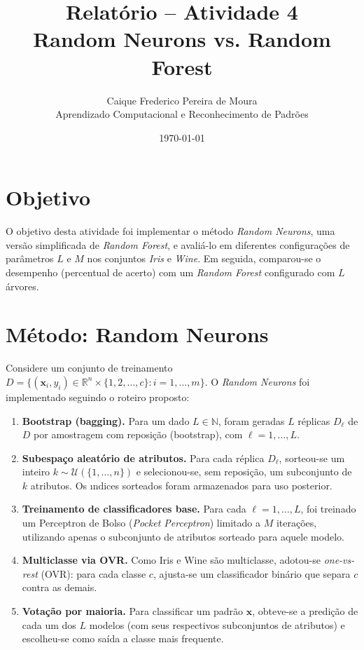 \documentclass[12pt,a4paper]{article}
\title{Relat\'orio -- Atividade 4\\Random Neurons vs. Random Forest}
\author{Caique Frederico Pereira de Moura\\ Aprendizado Computacional e Reconhecimento de Padr\~oes}
\date{\today}
\begin{document}
\maketitle

\section{Objetivo}
O objetivo desta atividade foi implementar o m\'etodo \emph{Random Neurons}, uma vers\~ao simplificada de \emph{Random Forest}, e avali\'a-lo em diferentes configura\c{c}\~oes de par\^ametros $L$ e $M$ nos conjuntos \emph{Iris} e \emph{Wine}. Em seguida, comparou-se o desempenho (percentual de acerto) com um \emph{Random Forest} configurado com $L$ \'arvores.

\section{M\'etodo: Random Neurons}
Considere um conjunto de treinamento $D = \{(\mathbf{x}_i,y_i) \in \mathbb{R}^n \times \{1,2,\dots,c\} : i=1,\dots,m\}$. O \emph{Random Neurons} foi implementado seguindo o roteiro proposto:

\begin{enumerate}
	\item \textbf{Bootstrap (bagging).} Para um dado $L \in \mathbb{N}$, foram geradas $L$ r\'eplicas $D_\ell$ de $D$ por amostragem com reposi\c{c}\~ao (bootstrap), com $\ell=1,\dots,L$.
	\item \textbf{Subespa\c{c}o aleat\'orio de atributos.} Para cada r\'eplica $D_\ell$, sorteou-se um inteiro $k \sim \mathcal{U}(\{1,\dots,n\})$ e selecionou-se, sem reposi\c{c}\~ao, um subconjunto de $k$ atributos. Os \i ndices sorteados foram armazenados para uso posterior.
	\item \textbf{Treinamento de classificadores base.} Para cada $\ell=1,\dots,L$, foi treinado um Perceptron de Bolso (\emph{Pocket Perceptron}) limitado a $M$ itera\c{c}\~oes, utilizando apenas o subconjunto de atributos sorteado para aquele modelo.
	\item \textbf{Multiclasse via OVR.} Como Iris e Wine s\~ao multiclasse, adotou-se \emph{one-vs-rest} (OVR): para cada classe $c$, ajusta-se um classificador bin\'ario que separa $c$ contra as demais.
	\item \textbf{Vota\c{c}\~ao por maioria.} Para classificar um padr\~ao $\mathbf{x}$, obteve-se a predi\c{c}\~ao de cada um dos $L$ modelos (com seus respectivos subconjuntos de atributos) e escolheu-se como sa\'ida a classe mais frequente.
\end{enumerate}
\end{document}
